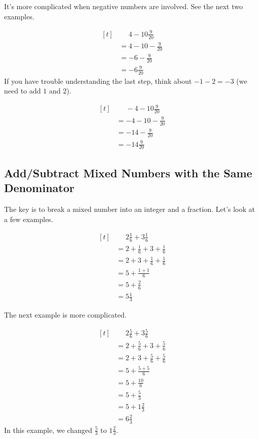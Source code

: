 It's more complicated when negative numbers are involved. See the next two examples.

\begin{myexample}
\[ 
\begin{aligned}[t]
	&\phantom{{}=}4-10\frac{9}{20} \\
	&=4-10-\frac{9}{20} \\
	&=-6-\frac{9}{20} \\
	&=-6\frac{9}{20}
\end{aligned}
\]
If you have trouble understanding the last step, think about $-1-2=-3$ (we need to add $1$ and $2$).
\end{myexample}

\begin{myexample}
\[ 
\begin{aligned}[t]
	&\phantom{{}=}-4-10\frac{9}{20} \\
	&=-4-10-\frac{9}{20} \\
	&=-14-\frac{9}{20} \\
	&=-14\frac{9}{20}
\end{aligned}
\]
\end{myexample}

\subsection{Add/Subtract Mixed Numbers with the Same Denominator}
The key is to break a mixed number into an integer and a fraction. Let's look at a few examples.

\begin{myexample}
\[ 
\begin{aligned}[t]
	&\phantom{{}=}2\frac{1}{6}+3\frac{1}{6} \\
	&= 2+\frac{1}{6}+3+\frac{1}{6} \\
	&= 2+3+\frac{1}{6}+\frac{1}{6} \\
	&= 5+\frac{1+1}{6} \\
	&= 5+\frac{2}{6} \\
	&= 5\frac{1}{3}
\end{aligned}
\]
\end{myexample}

The next example is more complicated.

\begin{myexample}
\[ 
\begin{aligned}[t]
	&\phantom{{}=}2\frac{5}{6}+3\frac{5}{6} \\
	&= 2+\frac{5}{6}+3+\frac{5}{6} \\
	&= 2+3+\frac{5}{6}+\frac{5}{6} \\
	&= 5+\frac{5+5}{6} \\
	&= 5+\frac{10}{6} \\
	&= 5+\frac{5}{3} \\
	&= 5+1\frac{2}{3} \\
	&= 6\frac{2}{3}
\end{aligned}
\]
In this example, we changed $\frac{5}{3}$ to $1\frac{2}{3}$.
\end{myexample}

